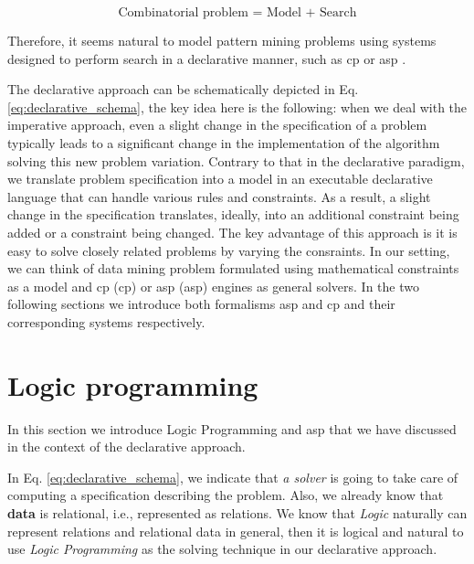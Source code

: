 \begin{center}
\begin{equation}\label{eq:declarative_schema}
  \text{Combinatorial problem = Model + Search}
\end{equation}
\end{center}

Therefore, it seems natural to model pattern mining problems 
using systems designed to perform search in a declarative manner, such
as \acrlong{cp} \parencite{handbookcp} or \acrlong{asp}
\parencite{whatisasp}. %

\pubrev


The declarative approach can be schematically depicted in Eq.
\ref{eq:declarative_schema}, the key idea here is the following: when
we deal with the imperative approach, even a slight change in the
specification of a problem typically leads to a significant change in
the implementation of the algorithm solving this new problem
variation. Contrary to that in the declarative paradigm, we translate
problem specification into a model in an executable declarative language that can
handle various rules and constraints. As a result, a slight change in
the specification translates, ideally, into an additional constraint
being added or a constraint being changed. The key advantage of this
approach is it is easy to solve  closely related problems by varying
the consraints. In our setting, we can think of data
mining problem formulated using mathematical constraints as a
model and \acrlong{cp} (\acrshort{cp}) or \acrlong{asp}
(\acrshort{asp}) engines
as general solvers. In the two following sections we introduce both
formalisms \acrshort{asp} and \acrshort{cp} and their corresponding systems respectively.



\section{Logic programming}\label{sec:logic_programming}
In this section we introduce Logic Programming and \acrlong{asp} that
we have discussed in the context of the declarative approach.


\pubrev
In Eq. \ref{eq:declarative_schema}, we indicate that \textit{a solver}
is going to take care of computing a specification describing the
problem. Also, we already know that \textbf{data} is relational, i.e., represented as relations. We know that \textit{Logic} naturally can represent relations and relational data in general, then it is logical and natural to use \textit{Logic Programming} as the solving technique in our declarative approach.
\pubrev

